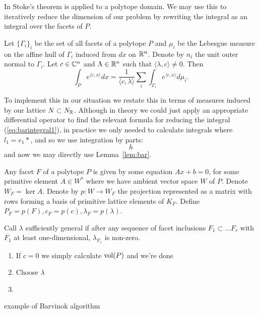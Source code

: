 In \cite{barvinok} Stoke's theorem is applied to a polytope domain. We may use this to iteratively reduce the dimension of our problem by rewriting the integral as an integral over the facets of \(P\).
\begin{lemma} \label{lem:bar}
Let \(\{\Gamma_i\}_i\) be the set of all facets of a polytope \(P\) and \(\mu_i\) be the Lebesgue measure on the affine hull of \(\Gamma_i\) induced from \(dx\) on \(\mathbb{R}^n\). Denote by \(n_i\) the unit outer normal to \(\Gamma_i\). Let \(c \in \mathbb{C}^n\) and \(\Lambda \in \mathbb{R}^n\) such that \(\langle \lambda, c \rangle \neq 0\). Then
\[
\int_P e^{\langle c, x \rangle} dx = \frac{1}{\langle c , \lambda \rangle} \sum_i \int_{\Gamma_i} e^{\langle c, x \rangle} d \mu_i.
\]
\end{lemma}
To implement this in our situation we restate this in terms of measures induced by our lattice \(N \subset N_{\mathbb{R}}\). Although in theory we could just apply an appropriate differential operator to find the relevant formula for reducing the integral (\ref{eq:barintegral1}), in practice we only needed to calculate integrals where \(l_1 = e_1*\), and so we use integration by parts:
\[
h
\]
and now we may directly use Lemma~\ref{lem:bar}.

Any facet \(F\) of a polytope \(P\) is given by some equation \(Ax + b = 0\), for some primitive element \(A \in W^*\) where we have ambient vector space \(W\) of \(P\). Denote \(W_F = \ker A\). Denote by \(p: W \to W_F\) the projection  represented as a matrix with rows forming a basis of primitive lattice elements of \(K_F\). Define \(P_F = p(F), c_F = p(c), \lambda_F = p(\lambda)\).

Call \(\lambda\) sufficiently general if after any sequence of facet inclusions \(F_1 \subset \dots F_r\) with \(F_1\) at least one-dimensional, \(\lambda_{F_1}\) is non-zero.

\begin{enumerate}
\item If \(c = 0\) we simply calculate \(\mathop{\rm vol}\nolimits(P)\) and we're done
\item Choose \(\lambda\)
\item 
\end{enumerate}
\begin{example}
example of Barvinok algorithm
\end{example}	